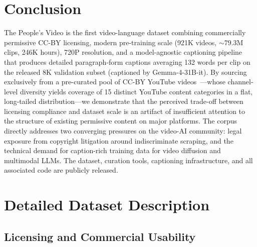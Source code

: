 \documentclass{article}
\begin{document}
\section{Conclusion}
\label{sec:conclusion}

The People's Video is the first video-language dataset combining commercially permissive CC-BY licensing, modern pre-training scale (921K videos, ${\sim}79.3$M clips, 246K hours), 720P resolution, and a model-agnostic captioning pipeline that produces detailed paragraph-form captions averaging 132 words per clip on the released 8K validation subset (captioned by Gemma-4-31B-it). By sourcing exclusively from a pre-curated pool of CC-BY YouTube videos~\cite{kandpal2025commonpile}---whose channel-level diversity yields coverage of 15 distinct YouTube content categories in a flat, long-tailed distribution---we demonstrate that the perceived trade-off between licensing compliance and dataset scale is an artifact of insufficient attention to the structure of existing permissive content on major platforms. The corpus directly addresses two converging pressures on the video-AI community: legal exposure from copyright litigation around indiscriminate scraping, and the technical demand for caption-rich training data for video diffusion and multimodal LLMs. The dataset, curation tools, captioning infrastructure, and all associated code are publicly released.




\appendix

\section{Detailed Dataset Description}
\label{app:dataset}

\subsection{Licensing and Commercial Usability}
\end{document}
